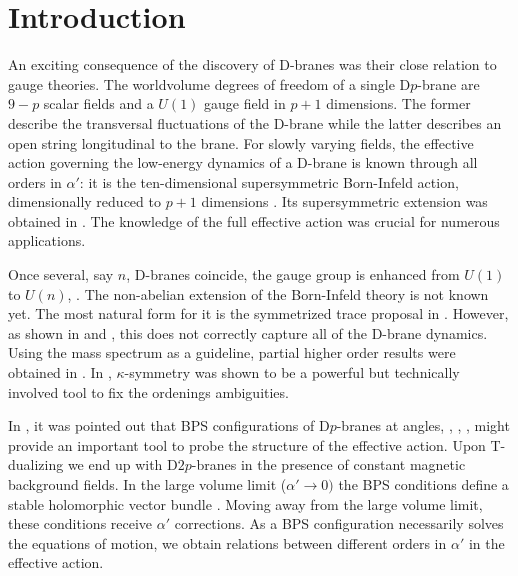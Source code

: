 \documentclass[a4paper,12pt,oneside]{article}
\begin{document}
\section{Introduction}
An exciting consequence of the discovery of D-branes \cite{pol} was their
close relation to gauge theories. The worldvolume
degrees of freedom of a single D$p$-brane are $9-p$ scalar fields and a
$U(1)$ gauge field in $p+1$ dimensions. The former describe the
transversal fluctuations of the D-brane while the latter describes an
open string longitudinal to the brane. For slowly varying fields, the
effective action governing the low-energy dynamics of a D-brane is known
through all orders in $\alpha '$: it is the ten-dimensional
supersymmetric Born-Infeld action, dimensionally reduced to $p+1$
dimensions \cite{BI}. Its supersymmetric extension was obtained in
\cite{susynbi}. The knowledge of the full effective action was crucial
for numerous applications.

Once several, say $n$, D-branes coincide, the gauge group is enhanced
from $U(1)$ to $U(n)$, \cite{witten}. The non-abelian extension of the
Born-Infeld theory is not known yet. The most natural form for it is the
symmetrized trace proposal in \cite{Tstr}. However, as shown in \cite{HT}
and \cite{DST}, this does not correctly capture all of the D-brane
dynamics. Using the mass spectrum as a guideline, partial higher order
results were obtained in \cite{STT}. In \cite{kappa}, $\kappa$-symmetry
was shown to be a powerful but technically involved tool to fix the
ordenings ambiguities.

In \cite{DST}, it was pointed out that BPS configurations of D$p$-branes
at angles, \cite{Angles1}, \cite{Angles2}, \cite{townsend},
might provide an important
tool to probe the structure of the effective action. Upon T-dualizing we
end up with D$2p$-branes in the presence of constant magnetic background
fields. In the large volume limit ($\alpha '\rightarrow 0)$ the BPS
conditions define a stable holomorphic vector bundle \cite{GSW}.
Moving away from the large volume limit, these conditions receive $\alpha
'$ corrections. As a BPS configuration necessarily solves the equations
of motion, we obtain relations between different orders in $\alpha '$ in
the effective action.
\end{document}
